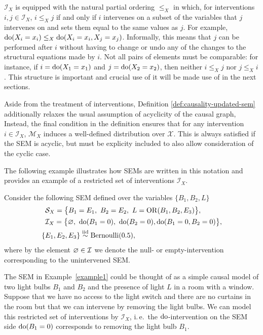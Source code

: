$\mathcal{I}_X$ is equipped with the natural partial ordering $\leq_X$ in which, for interventions ${i, j \in \mathcal{I}_X}$, ${i\leq_X j}$ if and only if $i$ intervenes on a subset of the variables that $j$ intervenes on and sets them equal to the same values as $j$.
For example, ${\operatorname{do}(X_i=x_i) \leq_X \operatorname{do}(X_i=x_i, X_j=x_j)}$.
Informally, this means that $j$ can be performed after $i$ without having to change or undo any of the changes to the structural equations made by $i$.
Not all pairs of elements must be comparable: for instance, if $i= \operatorname{do}(X_1=x_1)$ and $j = \operatorname{do}(X_2=x_2)$, then neither $i\leq_X j$ nor $j \leq_X i$. 
This structure is important and crucial use of it will be made use of in the next sections.

Aside from the treatment of interventions, Definition \ref{def:causality-updated-sem} additionally relaxes the usual assumption of acyclicity of the causal graph, 
Instead, the final condition in the definition ensures that for any intervention ${i \in \mathcal{I}_X}$, $\mathcal{M}_X$ induces a well-defined distribution over $\mathcal{X}$. 
This is always satisfied if the SEM is acyclic, but must be explicity included to also allow consideration of the cyclic case.

The following example illustrates how SEMs are written in this notation and provides an example of a restricted set of interventions $\mathcal{I}_X$.

\medskip

\begin{example}\label{example1}
Consider the following SEM defined over the variables $\{ B_1,B_2,L \}$
%
\begin{align*}
&\mathcal{S}_X = \big\{ B_1 = E_1,\ B_2 = E_2,\ L = \operatorname{OR}(B_1,B_2,E_3) \big\}, \\
%
&\mathcal{I}_X = \big\{ \nulli,\ \doop(B_1=0),\ \doop(B_2=0), \doop(B_1=0,B_2=0) \big\}, \\
%
\{ &E_1,E_2,E_3 \} \overset{\text{iid}}{\sim} \mathrm{Bernoulli}(0.5),
\end{align*}
%
where by the element $\varnothing \in \mathcal{I}$ we denote the null- or empty-intervention corresponding to the unintervened SEM\@.
\end{example}

The SEM in Example~\ref{example1} could be thought of as a simple causal model of two light bulbs $B_1$ and $B_2$ and the presence of light $L$ in a room with a window.
Suppose that we have no access to the light switch and there are no curtains in the room but that we can intervene by removing the light bulbs.
We can model this restricted set of interventions by $\mathcal{I}_X$, i.\,e.\ the $\operatorname{do}$-intervention on the SEM side ${\operatorname{do}(B_1=0)}$  corresponds to removing the light bulb $B_1$.


